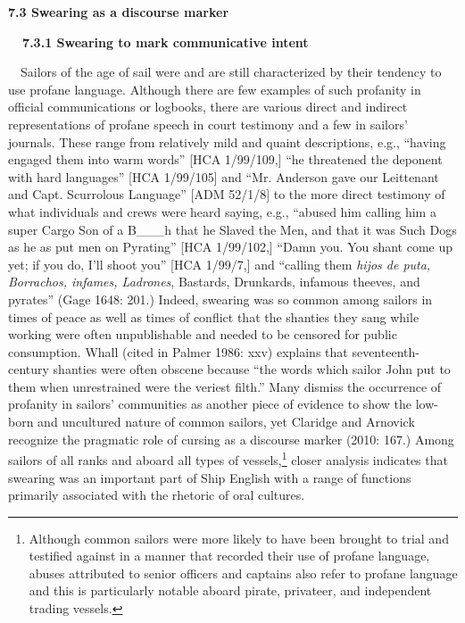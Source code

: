 \begin{styleStandard}
\textbf{7.3 Swearing as a discourse marker }
\end{styleStandard}

\begin{styleStandard}
\textbf{\ \ 7.3.1 Swearing to mark communicative intent}
\end{styleStandard}

\begin{styleStandard}
\ \ Sailors of the age of sail were and are still characterized by their tendency to use profane language. Although there are few examples of such profanity in official communications or logbooks, there are various direct and indirect representations of profane speech in court testimony and a few in sailors’ journals. These range from relatively mild and quaint descriptions, e.g., “having engaged them into warm words” [HCA 1/99/109,] “he threatened the deponent with hard languages” [HCA 1/99/105] and “Mr. Anderson gave our Leittenant and Capt. Scurrolous Language” [ADM 52/1/8] to the more direct testimony of what individuals and crews were heard saying, e.g., “abused him calling him a super Cargo Son of a B\_\_\_h that he Slaved the Men, and that it was Such Dogs as he as put men on Pyrating” [HCA 1/99/102,] “Damn you. You shant come up yet; if you do, I’ll shoot you” [HCA 1/99/7,] and “calling them \textit{hijos de puta, Borrachos, infames, Ladrones}, Bastards, Drunkards, infamous theeves, and pyrates” (Gage 1648: 201.) Indeed, swearing was so common among sailors in times of peace as well as times of conflict that the shanties they sang while working were often unpublishable and needed to be censored for public consumption. Whall (cited in Palmer 1986: xxv) explains that seventeenth-century shanties were often obscene because “the words which sailor John put to them when unrestrained were the veriest filth.” Many dismiss the occurrence of profanity in sailors’ communities as another piece of evidence to show the low-born and uncultured nature of common sailors, yet Claridge and Arnovick recognize the pragmatic role of cursing as a discourse marker (2010: 167.) Among sailors of all ranks and aboard all types of vessels,\footnote{ Although common sailors were more likely to have been brought to trial and testified against in a manner that recorded their use of profane language, abuses attributed to senior officers and captains also refer to profane language and this is particularly notable aboard pirate, privateer, and independent trading vessels.} closer analysis indicates that swearing was an important part of Ship English with a range of functions primarily associated with the rhetoric of oral cultures.
\end{styleStandard}

